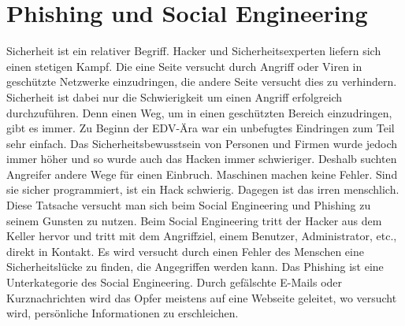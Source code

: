 \section{Phishing und Social Engineering}
Sicherheit ist ein relativer Begriff. Hacker und Sicherheitsexperten liefern sich einen stetigen Kampf. Die eine Seite versucht durch Angriff oder Viren in geschützte Netzwerke einzudringen, die andere Seite versucht dies zu verhindern.
Sicherheit ist dabei nur die Schwierigkeit um einen Angriff erfolgreich durchzuführen. Denn einen Weg, um in einen geschützten Bereich einzudringen, gibt es immer.
Zu Beginn der EDV-Ära war ein unbefugtes Eindringen zum Teil sehr einfach. Das Sicherheitsbewusstsein von Personen und Firmen wurde jedoch immer höher und so wurde auch das Hacken immer schwieriger. Deshalb suchten Angreifer andere Wege für einen Einbruch. 
Maschinen machen keine Fehler. Sind sie sicher programmiert, ist ein Hack schwierig. Dagegen ist das irren menschlich. Diese Tatsache versucht man sich beim Social Engineering und Phishing zu seinem Gunsten zu nutzen.
Beim Social Engineering tritt der Hacker aus dem Keller hervor und tritt mit dem Angriffziel, einem Benutzer, Administrator, etc., direkt in Kontakt. Es wird versucht durch einen Fehler des Menschen eine Sicherheitslücke zu finden, die Angegriffen werden kann. 
Das Phishing ist eine Unterkategorie des Social Engineering. Durch gefälschte E-Mails oder Kurznachrichten wird das Opfer meistens auf eine Webseite geleitet, wo versucht wird, persönliche Informationen zu erschleichen.

